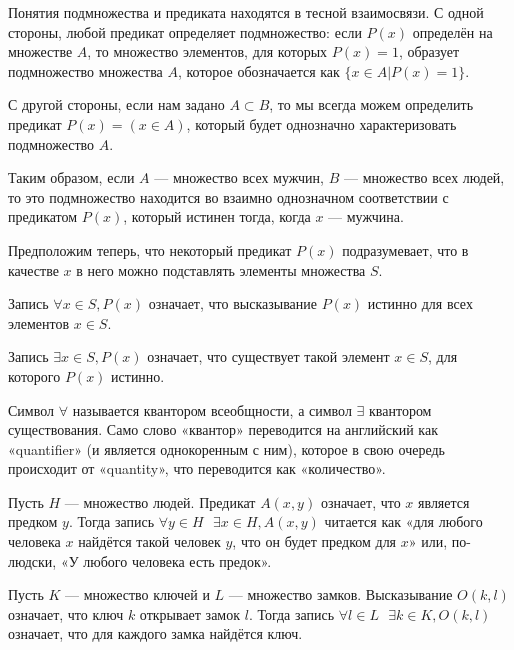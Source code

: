 Понятия подмножества и предиката находятся в тесной взаимосвязи. С одной стороны, любой предикат определяет подмно\-жест\-во: если $P(x)$ определён на множестве $A$, то множество элементов, для которых $P(x)=1$, образует подмножество множества $A$, которое обозначается как $ \{ x \in A|P(x) = 1 \} $.

С другой стороны, если нам задано $A \subset B$, то мы всегда можем определить предикат $P(x) = (x\in A)$, который будет однозначно характеризовать подмножество $A$.

Таким образом, если $A$ — множество всех мужчин, $B$ — множество всех людей, то это подмножество находится во взаимно однозначном соответствии с предикатом $P(x)$, который истинен тогда, когда $x$ — мужчина.

Предположим теперь, что некоторый предикат $P(x)$ подразумевает, что в качестве $x$ в него можно подставлять элементы множества $S$.

\begin{definition}
Запись $\forall x\in S, P(x)$ означает, что высказывание $P(x)$ истинно для всех элементов $x \in S$.
\end{definition}

\begin{definition}
Запись $\exists x\in S, P(x)$ означает, что существует такой элемент $x\in S$, для которого $P(x)$ истинно.
\end{definition}

Символ $\forall$ называется квантором всеобщности, а символ $\exists$ квантором существования.  Само слово «квантор» переводится на английский как «quantifier» (и является однокоренным с ним), которое в свою очередь происходит от «quantity», что переводится как «количество».

\begin{example}
Пусть $H$ — множество людей. Предикат $A(x, y)$ означает, что $x$ является предком $y$. Тогда запись $\forall y\in H \mbox{ } \exists x \in H, A(x, y)$ читается как «для любого человека $x$ найдётся такой человек $y$, что он будет предком для $x$» или, по-людски, «У любого человека есть предок».
\end{example}

\begin{example}
Пусть $K$ — множество ключей и $L$ — множество замков. Высказывание $O(k, l)$ означает, что ключ $k$ открывает замок $l$. Тогда запись $\forall l\in L \mbox{ } \exists k \in K, O(k, l)$ означает, что для каждого замка найдётся ключ.
\end{example}

